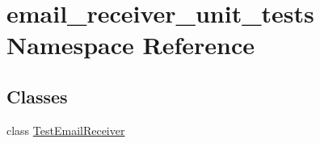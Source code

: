 \hypertarget{namespaceemail__receiver__unit__tests}{\section{email\-\_\-receiver\-\_\-unit\-\_\-tests Namespace Reference}
\label{namespaceemail__receiver__unit__tests}
}
\subsection*{Classes}
\begin{DoxyCompactItemize}
\item 
class \hyperlink{classemail__receiver__unit__tests_1_1TestEmailReceiver}{Test\-Email\-Receiver}
\end{DoxyCompactItemize}
